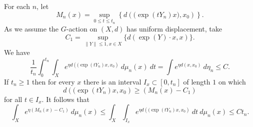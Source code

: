 \documentclass[10pt,reqno]{amsart}
\theoremstyle{Theorem}
\theoremstyle{definition}
\theoremstyle{remark}
\newcommand{\note}[1]{\marginpar{{\color{red}\footnotesize \begin{spacing}{1}#1\end{spacing}}}}
\renewcommand{\epsilon}{\varepsilon}
\newcommand{\inv}{^{-1}}
\def\calA{\mathcal A}
\def\blue{}
\begin{document}



For each $n$, let $$M_n(x) = \sup _{0\le t\le t_n}\left\{d\left( \big(\exp (tY_n) x\big),x_0\right)\right\}.$$ %
As we assume the  $G$-action on $(X,d)$ has uniform displacement, take $$C_1 = \sup_{\|Y\|\le 1, x\in X} \{d(\exp (Y)\cdot x, x)\}.$$
{\blue
We have  $$ \frac{1}{t_n} \int_0^{t_n} \int_X e^{\eta d\left( (\exp (tY_n) x ,x_0\right)} \ d \mu_n(x) \ d t= \int e^{\eta d(x,x_0)} \ d \eta_n \le C.$$
If $t_n\ge 1$ then for every $x$ there is an interval $I_x\subset [0,t_n]$ of length $1$ on which $$d\left( (\exp (tY_n) x ,x_0\right)\ge (M_n (x)-  C_1)$$ for all $t\in I_x.$
It follows that
$$\int_X e^{\eta (M_n (x)-  C_1)}   \ d \mu_n(x) \le    \int_X \int_{I_x} e^{\eta d\left( (\exp (tY_n) x ,x_0\right)} \ d t  \ d \mu_n(x) \le  Ct_n.  $$ %
}
\end{document}
